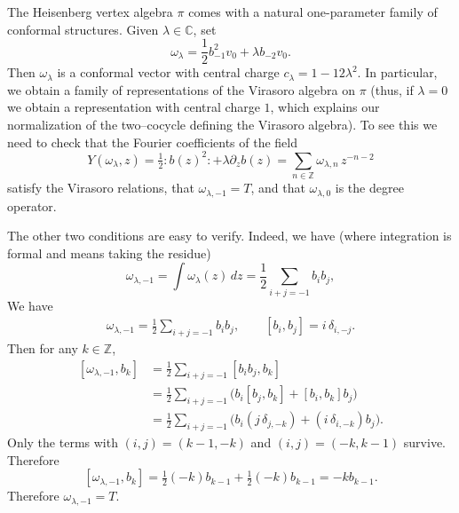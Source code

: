 \documentclass[12pt]{article}
\begin{document}
\begin{example}
    The Heisenberg vertex algebra $\pi$ comes with a natural one-parameter
    family of conformal structures. Given $\lambda\in\mathbb{C}$, set
    \[
        \omega_\lambda = \frac{1}{2}b_{-1}^2v_0 + \lambda b_{-2}v_0.
    \]
    Then $\omega_\lambda$ is a conformal vector with central charge
    $c_\lambda = 1 - 12\lambda^2$.
    In particular, we obtain a family of representations of the
    Virasoro algebra on $\pi$ (thus, if $\lambda=0$ we obtain a representation
    with central charge $1$, which explains our normalization of the
    two--cocycle defining the Virasoro algebra).
    To see this we need to check that the Fourier coefficients of the field
    \[
        Y(\omega_\lambda,z)
        = \tfrac{1}{2} :b(z)^2: + \lambda \partial_z b(z)
        = \sum_{n\in\mathbb{Z}} \omega_{\lambda,n}\, z^{-n-2}
    \]
    satisfy the Virasoro relations, that $\omega_{\lambda,-1}=T$, and that
    $\omega_{\lambda,0}$ is the degree operator.

    \medskip
    \noindent
    The other two conditions are easy to verify. Indeed, we have (where integration is formal and means taking the residue)
    \[
        \omega_{\lambda,-1}
        = \int \omega_\lambda(z)\,dz
        = \frac{1}{2} \sum_{i+j=-1} b_i b_j,
    \]
    We have
    \begin{align*}
        \omega_{\lambda,-1} = \frac12\sum_{i+j=-1} b_i b_j,
        \qquad [b_i,b_j] = i\,\delta_{i,-j}.
    \end{align*}
    Then for any $k\in\mathbb Z$,
    \[\begin{aligned}
            [\omega_{\lambda,-1}, b_k]
             & =\frac12\sum_{i+j=-1} [b_i b_j, b_k]                                              \\
             & =\frac12\sum_{i+j=-1} \big( b_i[b_j,b_k] + [b_i,b_k]b_j \big)                     \\
             & =\frac12\sum_{i+j=-1} \big( b_i (j\,\delta_{j,-k}) + (i\,\delta_{i,-k})b_j \big).
        \end{aligned}\]
    Only the terms with $(i,j)=(k-1,-k)$ and $(i,j)=(-k,k-1)$ survive.  Therefore
    \[
        [\omega_{\lambda,-1}, b_k] = \tfrac12(-k)b_{k-1} + \tfrac12(-k)b_{k-1} = -k b_{k-1}.
    \]
    Therefore $\omega_{\lambda,-1} = T$.


\end{example}
\end{document}
